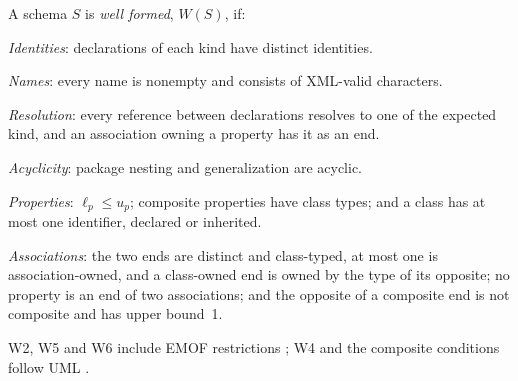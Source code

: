 \begin{definition}\label{def:wellformed}
A schema $S$ is \emph{well formed}, $W(S)$, if:
\begin{list}{}{\setlength{\leftmargin}{9mm}\setlength{\labelwidth}{8mm}%
 \setlength{\itemsep}{1pt}\setlength{\parsep}{0pt}\setlength{\topsep}{2pt}}
\item[(W1)] \emph{Identities}: declarations of each kind have distinct identities.
\item[(W2)] \emph{Names}: every name is nonempty and consists of XML-valid characters.
\item[(W3)] \emph{Resolution}: every reference between declarations resolves to
 one of the expected kind, and an association owning a property has it as an end.
\item[(W4)] \emph{Acyclicity}: package nesting and generalization are acyclic.
\item[(W5)] \emph{Properties}: $\ell_p\leq u_p$; composite properties have class
 types; and a class has at most one identifier, declared or inherited.
\item[(W6)] \emph{Associations}: the two ends are distinct and class-typed, at
 most one is association-owned, and a class-owned end is owned by the type of its
 opposite; no property is an end of two associations; and the opposite of a composite
 end is not composite and has upper bound~1.
\end{list}
\end{definition}
W2, W5 and W6 include EMOF restrictions \cite{omg_mof_251}; W4 and the composite
conditions follow UML \cite{omg_uml_25}.

